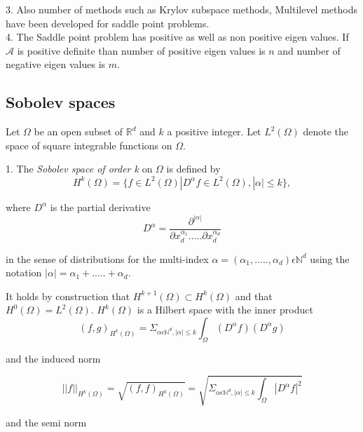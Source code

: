 \documentclass[a4paper,12pt]{book}
\begin{document}
3. Also number of methods such as Krylov subspace methods, Multilevel methods have been developed for saddle point problems.\\

4. The Saddle point problem has positive as well as non positive eigen values. If $\mathcal{A}$ is positive definite than number of positive eigen values is $n$ and number of negative eigen values is $m$. \\

\subsection{Sobolev spaces} \cite{crbm}

Let $\Omega$ be an open subset of $\mathbb{R}^d$ and $k$ a positive integer. Let $L^2(\Omega)$ denote the space of square integrable functions on $\Omega$. 

1. The \textit{Sobolev space of order k} on $\Omega$ is defined by\\
\begin{equation}
H^k (\Omega) = \lbrace f \in L^2 (\Omega) | D^\alpha f \in L^2 (\Omega), |\alpha| \leq k \rbrace ,
\end{equation} 

where $D^\alpha$ is the partial derivative
\begin{equation}
D^\alpha = \frac{\partial^{|\alpha|}}{\partial x_d^{\alpha_1} ..... \partial x_d^{\alpha_d}}
\end{equation}

in the sense of distributions for the multi-index $\alpha = (\alpha_1,.....,\alpha_d) \epsilon \mathbb{N}^d$ using the notation $|\alpha| = \alpha_1 + ..... + \alpha_d $.

It holds by construction that $H^{k+1}(\Omega) \subset H^k (\Omega)$ and that $H^0 (\Omega) = L^2 (\Omega)$. $H^k(\Omega)$ is a Hilbert space with the inner product
\begin{equation}
(f,g)_{H^k(\Omega)} = \Sigma_{\alpha \epsilon \mathbb{N}^d, |\alpha| \leq k} \int_\Omega (D^\alpha f) (D^\alpha g)
\end{equation}

and the induced norm 

\begin{equation}
||f||_{H^k (\Omega)} = \sqrt{(f,f)_{H^k(\Omega)}} = \sqrt{\Sigma_{\alpha \epsilon \mathbb{N}^d, |\alpha| \leq k} \int_\Omega |D^\alpha f|^2}
\end{equation}

and the semi norm 
\end{document}
